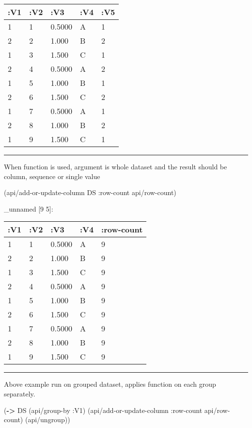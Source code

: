 \documentclass[]{article}
\newenvironment{Shaded}{\begin{snugshade}}{\end{snugshade}}
\newcommand{\KeywordTok}[1]{\textcolor[rgb]{0.13,0.29,0.53}{\textbf{#1}}}
\newcommand{\AttributeTok}[1]{\textcolor[rgb]{0.77,0.63,0.00}{#1}}
\newcommand{\NormalTok}[1]{#1}
\begin{document}
\begin{longtable}[]{@{}lllll@{}}
\toprule
:V1 & :V2 & :V3 & :V4 & :V5\tabularnewline
\midrule
\endhead
1 & 1 & 0.5000 & A & 1\tabularnewline
2 & 2 & 1.000 & B & 2\tabularnewline
1 & 3 & 1.500 & C & 1\tabularnewline
2 & 4 & 0.5000 & A & 2\tabularnewline
1 & 5 & 1.000 & B & 1\tabularnewline
2 & 6 & 1.500 & C & 2\tabularnewline
1 & 7 & 0.5000 & A & 1\tabularnewline
2 & 8 & 1.000 & B & 2\tabularnewline
1 & 9 & 1.500 & C & 1\tabularnewline
\bottomrule
\end{longtable}

\begin{center}\rule{0.5\linewidth}{0.5pt}\end{center}

When function is used, argument is whole dataset and the result should
be column, sequence or single value

\begin{Shaded}
\begin{Highlighting}[]
\NormalTok{(api/add-or-update-column DS }\AttributeTok{:row-count}\NormalTok{ api/row-count) }
\end{Highlighting}
\end{Shaded}

\_unnamed {[}9 5{]}:

\begin{longtable}[]{@{}lllll@{}}
\toprule
:V1 & :V2 & :V3 & :V4 & :row-count\tabularnewline
\midrule
\endhead
1 & 1 & 0.5000 & A & 9\tabularnewline
2 & 2 & 1.000 & B & 9\tabularnewline
1 & 3 & 1.500 & C & 9\tabularnewline
2 & 4 & 0.5000 & A & 9\tabularnewline
1 & 5 & 1.000 & B & 9\tabularnewline
2 & 6 & 1.500 & C & 9\tabularnewline
1 & 7 & 0.5000 & A & 9\tabularnewline
2 & 8 & 1.000 & B & 9\tabularnewline
1 & 9 & 1.500 & C & 9\tabularnewline
\bottomrule
\end{longtable}

\begin{center}\rule{0.5\linewidth}{0.5pt}\end{center}

Above example run on grouped dataset, applies function on each group
separately.

\begin{Shaded}
\begin{Highlighting}[]
\NormalTok{(}\KeywordTok{->}\NormalTok{ DS}
\NormalTok{    (api/group-by }\AttributeTok{:V1}\NormalTok{)}
\NormalTok{    (api/add-or-update-column }\AttributeTok{:row-count}\NormalTok{ api/row-count)}
\NormalTok{    (api/ungroup))}
\end{Highlighting}
\end{Shaded}
\end{document}
